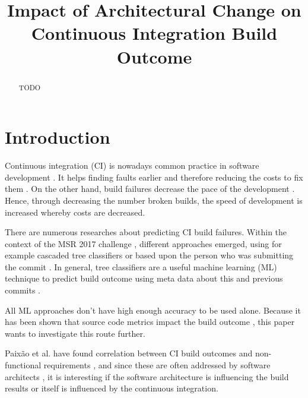 \documentclass[conference]{IEEEtran}
\begin{document}
\title{Impact of Architectural Change on
	Continuous Integration Build Outcome\\
}

\author{
}

\maketitle

\begin{abstract}
TODO
\end{abstract}

\section{Introduction}

Continuous integration (CI) is nowadays common practice in software development \cite{CI-Common}. It helps finding faults earlier and therefore reducing the costs to fix them \cite{NutzenCI}. On the other hand, build failures decrease the pace of the development \cite{Costs-BuildFailures}. Hence, through decreasing the number broken builds, the speed of development is increased whereby costs are decreased.

There are numerous researches about predicting CI build failures. Within the context of the MSR 2017 challenge \cite{TravisTorrent},  different approaches emerged, using for example cascaded tree classifiers \cite{Pred-Cascade} or based upon the person who was submitting the commit \cite{ContrInvolv}. In general, tree classifiers are a useful machine learning (ML) technique to predict build outcome using meta data about this and previous commits \cite{Pred-Tree, ML-Project}. 

All ML approaches don't have high enough accuracy to be used alone. Because it has been shown that source code metrics impact the build outcome \cite{FailsCorr}, this paper wants to investigate this route further. 

Paixão et al. have found correlation between CI build outcomes and non-functional requirements \cite{Fail-NFReq}, and since these are often addressed by software architects \cite{NFR-Architects}, it is interesting if the software architecture is influencing the build results or itself is influenced by the continuous integration. 
\end{document}
